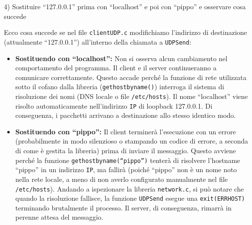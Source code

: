 \documentclass[11pt]{article}
\begin{document}
\begin{tcolorbox}[colback=blue!5!white,colframe=blue!75!black,title=\textbf{DOMANDA}, breakable]
4) Sostituire ``127.0.0.1'' prima con ``localhost'' e poi con ``pippo'' e osservare cosa succede
\end{tcolorbox}

\begin{tcolorbox}[colback=green!5!white,colframe=green!75!black,title=\textbf{RISPOSTA}, breakable]
Ecco cosa succede se nel file \texttt{clientUDP.c} modifichiamo l'indirizzo di destinazione (attualmente ``127.0.0.1'') all'interno della chiamata a \texttt{UDPSend}:

\begin{itemize}
    \item \textbf{Sostituendo con ``localhost'':}
    Non si osserva alcun cambiamento nel comportamento del programma. Il client e il server continueranno a comunicare correttamente. Questo accade perché la funzione di rete utilizzata sotto il cofano dalla libreria (\texttt{gethostbyname()}) interroga il sistema di risoluzione dei nomi (DNS locale o file \texttt{/etc/hosts}). Il nome ``localhost'' viene risolto automaticamente nell'indirizzo \texttt{IP} di loopback 127.0.0.1. Di conseguenza, i pacchetti arrivano a destinazione allo stesso identico modo.
    
    \item \textbf{Sostituendo con ``pippo'':}
    Il client terminerà l'esecuzione con un errore (probabilmente in modo silenzioso o stampando un codice di errore, a seconda di come è gestita la libreria) prima di inviare il messaggio. Questo avviene perché la funzione \texttt{gethostbyname(``pippo'')} tenterà di risolvere l'hostname ``pippo'' in un indirizzo \texttt{IP}, ma fallirà (poiché ``pippo'' non è un nome noto nella rete locale, a meno di non averlo configurato manualmente nel file \texttt{/etc/hosts}). Andando a ispezionare la libreria \texttt{network.c}, si può notare che quando la risoluzione fallisce, la funzione \texttt{UDPSend} esegue una \texttt{exit(ERRHOST)} terminando brutalmente il processo. Il server, di conseguenza, rimarrà in perenne attesa del messaggio.
\end{itemize}
\end{tcolorbox}
\end{document}
